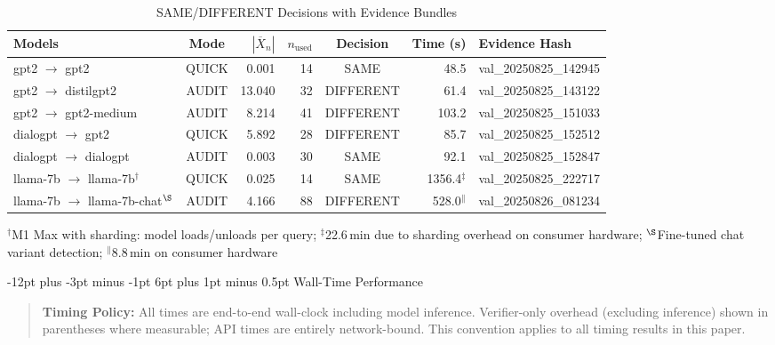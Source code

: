 \documentclass[11pt]{article}
\makeatletter
\renewcommand\subsection{\@startsection{subsection}{2}{\z@}%
  {-12pt plus -3pt minus -1pt}%
  {6pt plus 1pt minus 0.5pt}%
  {\normalfont\large\bfseries}}
\makeatother
\begin{document}
\begin{table}[ht!]
\centering
\caption{SAME/DIFFERENT Decisions with Evidence Bundles}
\label{tab:decisions}
\small
\begin{tabular}{@{}l c r r c r l@{}}
\toprule
\textbf{Models} & \textbf{Mode} & \textbf{$|\overline{X}_n|$} & \textbf{$n_{\text{used}}$} & \textbf{Decision} & \textbf{Time (s)} & \textbf{Evidence Hash} \\
\midrule
gpt2 $\to$ gpt2 & QUICK & 0.001 & 14 & SAME & 48.5 & val\_20250825\_142945 \\
gpt2 $\to$ distilgpt2 & AUDIT & 13.040 & 32 & DIFFERENT & 61.4 & val\_20250825\_143122 \\
gpt2 $\to$ gpt2-medium & AUDIT & 8.214 & 41 & DIFFERENT & 103.2 & val\_20250825\_151033 \\
dialogpt $\to$ gpt2 & QUICK & 5.892 & 28 & DIFFERENT & 85.7 & val\_20250825\_152512 \\
dialogpt $\to$ dialogpt & AUDIT & 0.003 & 30 & SAME & 92.1 & val\_20250825\_152847 \\
llama-7b $\to$ llama-7b$^{\dagger}$ & QUICK & 0.025 & 14 & SAME & 1356.4$^{\ddagger}$ & val\_20250825\_222717 \\
llama-7b $\to$ llama-7b-chat$^{\S}$ & AUDIT & 4.166 & 88 & DIFFERENT & 528.0$^{\|}$ & val\_20250826\_081234 \\
\bottomrule
\end{tabular}

\vspace{3pt}
\footnotesize{$^{\dagger}$M1 Max with sharding: model loads/unloads per query; $^{\ddagger}$22.6\,min due to sharding overhead on consumer hardware; $^{\S}$Fine-tuned chat variant detection; $^{\|}$8.8\,min on consumer hardware}
\end{table}

\subsection{Wall-Time Performance}

\begin{quote}
\footnotesize
\textbf{Timing Policy:} All times are end-to-end wall-clock including model inference. Verifier-only overhead (excluding inference) shown in parentheses where measurable; API times are entirely network-bound. This convention applies to all timing results in this paper.
\end{quote}
\end{document}
